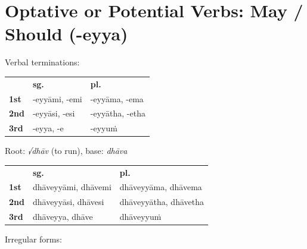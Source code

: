 \documentclass[11pt,oneside]{memoir}
\begin{document}
\normalArrayStrech

\clearpage

\section{Optative or Potential Verbs: May / Should (-eyya)}
\label{sec:orgfbde912}

{\centering\par
\begin{multicols}{2}

Verbal terminations:

\begin{center}
\begin{tabular}{lll}
 & \textbf{sg.} & \textbf{pl.}\\[0pt]
\textbf{1st} & -eyyāmi, -emi & -eyyāma, -ema\\[0pt]
\textbf{2nd} & -eyyāsi, -esi & -eyyātha, -etha\\[0pt]
\textbf{3rd} & -eyya, -e & -eyyuṁ\\[0pt]
\end{tabular}
\end{center}

\columnbreak

Root: \emph{√dhāv} (to run), base: \emph{dhāva}

\begin{center}
\begin{tabular}{lll}
 & \textbf{sg.} & \textbf{pl.}\\[0pt]
\textbf{1st} & dhāveyyāmi, dhāvemi & dhāveyyāma, dhāvema\\[0pt]
\textbf{2nd} & dhāveyyāsi, dhāvesi & dhāveyyātha, dhāvetha\\[0pt]
\textbf{3rd} & dhāveyya, dhāve & dhāveyyuṁ\\[0pt]
\end{tabular}
\end{center}

\end{multicols}
\par}

Irregular forms:
\end{document}
